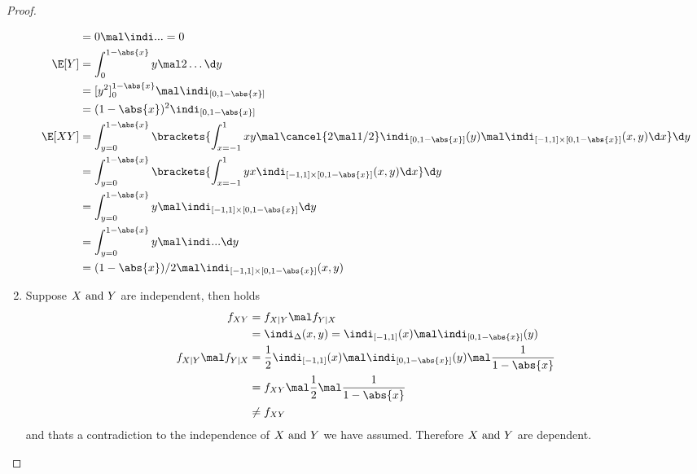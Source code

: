 \begin{proof}
\begin{enumerate}
\begin{align*}
			&= 0 \mal \indi ... = 0\\
			\E[Y] &= \int_0^{1-\abs{x}} y \mal 2 \dots \d y\\
			&= [y^2]_0^{1-\abs{x}} \mal \indi_{[0,1-\abs{x}]}\\
			&= (1-\abs{x})^2\indi_{[0,1-\abs{x}]}\\
			\E[XY] &= \int_{y=0}^{1-\abs{x}} \brackets{\int_{x=-1}^1 xy \mal \cancel{2\mal 1/2} \indi_{[0,1-\abs{x}]} (y) \mal \indi_{[-1,1]\times[0,1-\abs{x}]}(x,y) \d x} \d y\\
			&= \int_{y=0}^{1-\abs{x}} \brackets{\int_{x=-1}^1 y x \indi_{[-1,1]\times[0,1-\abs{x}]} (x,y)\d x}\d y\\
			&= \int_{y=0}^{1-\abs{x}} y \mal \indi_{[-1,1]\times[0,1-\abs{x}]} \d y\\
			&= \int_{y=0}^{1-\abs{x}} y \mal \indi ... \d y\\
			&= (1-\abs{x})/2 \mal \indi_{[-1,1]\times[0,1-\abs{x}]}(x,y)
		\end{align*}
		\item Suppose $X \text{ and } Y$ are independent, then holds
		\begin{align*}
			f_{XY} &= f_{X\mid Y} \mal f_{Y\mid X}\\
			&= \indi_{\Delta}(x,y) = \indi_{[-1,1]}(x) \mal \indi_{[0,1-\abs{x}]}(y)\\
			f_{X\mid Y} \mal f_{Y\mid X} &=\frac{1}{2} \indi_{[-1,1]}(x) \mal \indi_{[0,1-\abs{x}]}(y) \mal \frac{1}{1-\abs{x}}\\
			&= f_{XY} \mal \frac{1}{2}\mal \frac{1}{1-\abs{x}}\\
			&\neq f_{XY} 
		\end{align*}
		and thats a contradiction to the independence of $X \text{ and } Y$ we have assumed. Therefore $X \text{ and } Y$ are dependent.
	\end{enumerate}
\end{proof}
